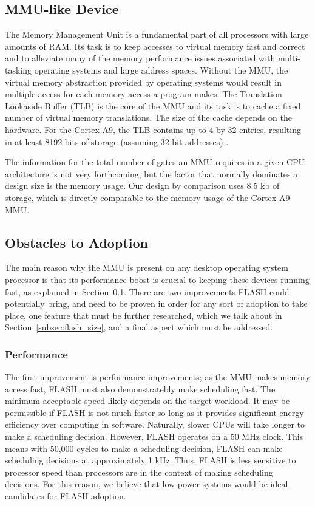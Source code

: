 \documentclass{sig-alternate-10pt}
\begin{document}
\subsection{MMU-like Device}
\label{subsec:mmu}
The Memory Management Unit is a fundamental part of all processors with
large amounts of RAM. Its task is to keep accesses to virtual memory fast
and correct and to alleviate many of the memory performance issues
associated with multi-tasking operating systems and large address spaces.
Without the MMU, the virtual memory abstraction provided by operating
systems would result in multiple access for each memory access a program
makes. The Translation Lookaside Buffer (TLB) is the core of the MMU and its
task is to cache a fixed number of virtual memory translations. The size of
the cache depends on the hardware. For the Cortex A9, the TLB contains up to
4 by 32 entries, resulting in at least 8192 bits of storage (assuming 32 bit
addresses) \cite{arm_mmu}.

The information for the total number of gates an MMU requires in a given CPU architecture is not very forthcoming, but the factor that normally dominates a design size is the memory usage. Our design by comparison uses 8.5 kb of storage, which is directly comparable to the memory usage of the Cortex A9 MMU.

\subsection{Obstacles to Adoption}
The main reason why the MMU is present on any desktop operating system
processor is that its performance boost is crucial to keeping these devices
running fast, as explained in Section~\ref{subsec:mmu}. There are two
improvements FLASH could potentially bring, and need to be proven in order
for any sort of adoption to take place, one feature that must be further
researched, which we talk about in Section~\ref{subsec:flash_size}, and
a final aspect which must be addressed.

\subsubsection{Performance}
The first improvement is performance improvements; as the MMU makes memory
access fast, FLASH must also demonstratebly make scheduling fast. The
minimum acceptable speed likely depends on the target workload.  It may be
permissible if FLASH is not much faster so long as it provides significant
energy efficiency over computing in software. Naturally, slower CPUs will
take longer to make a scheduling decision.  However, FLASH operates on a 50
MHz clock.  This means with 50,000 cycles to make a scheduling decision,
FLASH can make scheduling decisions at approximately 1 kHz. Thus, FLASH is
less sensitive to processor speed than processors are in the context of
making scheduling decisions. For this reason, we believe that low power
systems would be ideal candidates for FLASH adoption.
\end{document}
